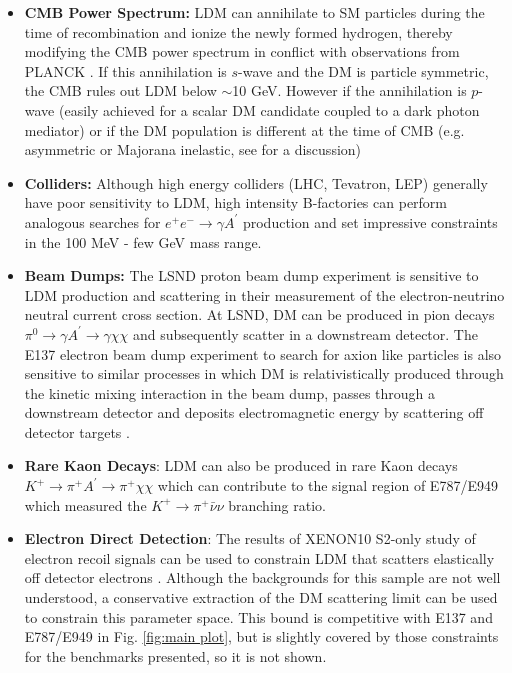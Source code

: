 \documentclass{article}
\begin{document}
\begin{itemize}

\item {\bf CMB Power Spectrum:} LDM can annihilate to SM particles during the time of recombination and ionize the newly 
formed hydrogen, thereby modifying the CMB power spectrum in conflict with observations from PLANCK \cite{dodge}. 
If this annihilation is $s$-wave and the DM is particle symmetric, the CMB rules out  LDM below $\sim $10 GeV. However
if the annihilation is $p$-wave (easily achieved for a scalar DM candidate coupled to a dark photon mediator) or 
if the DM population is different at the time of CMB (e.g. asymmetric or Majorana inelastic, see \cite{Izaguirre:2015yja} for a discussion)  
 
\item {\bf Colliders:} Although high energy colliders (LHC, Tevatron, LEP) generally have poor sensitivity to LDM, high intensity B-factories 
can perform analogous searches for $e^+e^- \to \gamma A^\prime$ production and set impressive constraints in the 100 MeV - few GeV 
mass range. 

\item {\bf Beam Dumps: } The LSND proton beam dump experiment  \cite{deNiverville:2011it} is sensitive to LDM production and scattering
in their measurement of the electron-neutrino neutral current cross section. At LSND, DM can be produced in pion decays $\pi^0 \to \gamma A^\prime \to \gamma \chi \chi$
and subsequently scatter in a downstream detector.  The E137 electron beam dump experiment  to search for axion like particles is also sensitive to 
similar processes in which DM is relativistically  produced through the kinetic mixing interaction in the beam dump, passes through a downstream 
 detector and deposits electromagnetic energy by scattering off detector targets  \cite{Batell:2014mga}. 

\item{\bf Rare Kaon Decays}: LDM can also be produced in rare Kaon decays $K^+ \to \pi^+ A^\prime \to \pi^+ \chi \chi$ which 
can contribute to the signal region of E787/E949  \cite{Adler:1997am,Artamonov:2008qb} which measured the $K^+ \to \pi^+ \bar \nu \nu$ branching ratio. 

\item{\bf Electron Direct Detection}: The results of XENON10 S2-only study of electron recoil signals can be used to 
constrain LDM that scatters elastically off detector electrons \cite{Essig:2012yx}. Although the backgrounds for this sample are not well understood,
a conservative extraction of the DM scattering limit can be used to constrain this parameter space. This bound is competitive with 
E137 and E787/E949 in Fig. \ref{fig:main plot}, but is slightly covered by those constraints for the benchmarks presented, so it is not shown.

\end{itemize}
\end{document}
